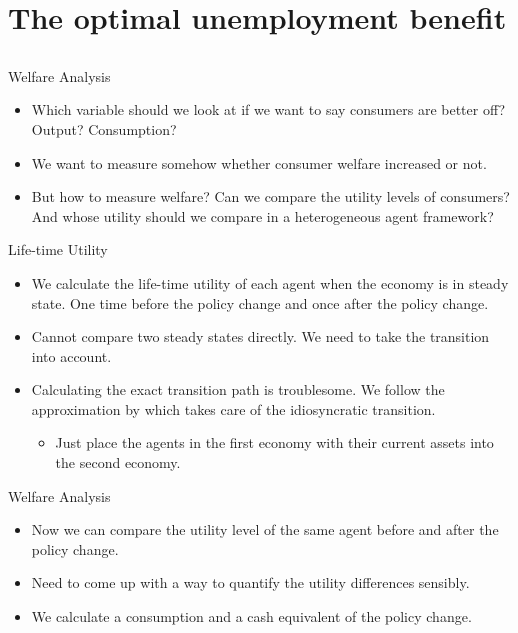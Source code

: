 \documentclass{beamer}
\begin{document}
\section{The optimal unemployment benefit}
\subsection{}
\begin{frame}{Welfare Analysis}
  \begin{itemize}
  \item {
  Which variable should we look at if we want to say consumers are better off? Output? Consumption?
  }
  \item {
  We want to measure somehow whether consumer welfare increased or not.
  }
  \item {
  But how to measure welfare? Can we compare the utility levels of consumers? And whose utility should we compare in a heterogeneous agent framework?
  }
  \end{itemize}
\end{frame}

\begin{frame}{Life-time Utility}
  \begin{itemize}
  \item {
  We calculate the life-time utility of each agent when the economy is in steady state. One time before the policy change and once after the policy change.
  }
  \item {
  Cannot compare two steady states directly. We need to take the transition into account.
  }
  \item {
  Calculating the exact transition path is troublesome. We follow the approximation by \citeauthor{sahin} \cite{sahin} which takes care of the idiosyncratic transition.
  }
    \begin{itemize}
    \item {
    Just place the agents in the first economy with their current assets into the second economy.
    }
    \end{itemize}
  \end{itemize}
\end{frame}

\begin{frame}{Welfare Analysis}
  \begin{itemize}
  \item {
  Now we can compare the utility level of the same agent before and after the policy change.
  }
  \item {
  Need to come up with a way to quantify the utility differences sensibly.
  }
  \item {
  We calculate a consumption and a cash equivalent of the policy change.
  }
  \end{itemize}
\end{frame}
\end{document}
